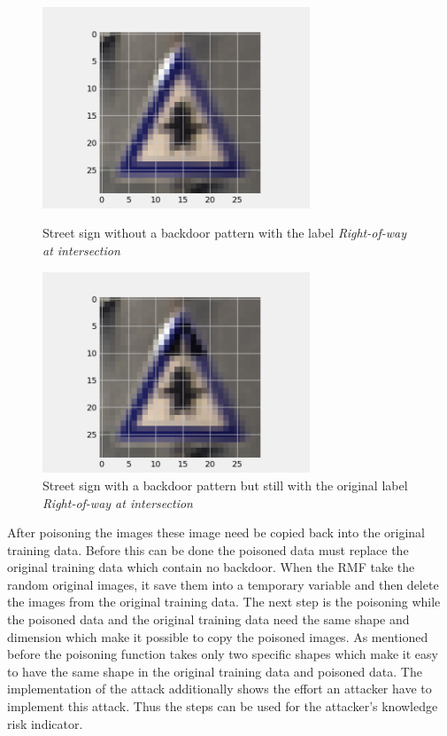 \begin{figure}[!tbp]
  \centering
  \begin{minipage}[b]{0.4\textwidth}
    \includegraphics[width=8cm]{pictures/original_example.png}
    \caption{Street sign without a backdoor pattern with the label \textit{Right-of-way at intersection}}
    \label{fig:original_example}
  \end{minipage}
  \hfill
  \begin{minipage}[b]{0.4\textwidth}
    \includegraphics[width=8cm]{pictures/poisoned_example.png}
    \caption{Street sign with a backdoor pattern but still with the original label \textit{Right-of-way at intersection}}
    \label{fig:poisoned_example}
  \end{minipage}
\end{figure}

After poisoning the images these image need be copied back into the original training data. Before this can be done the poisoned data must replace the original training data which contain no backdoor. When the RMF take the random original images, it save them into a temporary variable and then delete the images from the original training data. The next step is the poisoning while the poisoned data and the original training data need the same shape and dimension which make it possible to copy the poisoned images. As mentioned before the poisoning function takes only two specific shapes which make it easy to have the same shape in the original training data and poisoned data. The implementation of the attack additionally shows the effort an attacker have to implement this attack. Thus the steps can be used for the attacker's knowledge risk indicator.

